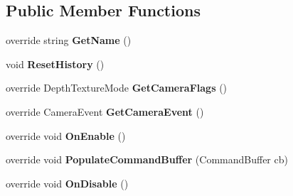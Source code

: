\subsection*{Public Member Functions}
\begin{DoxyCompactItemize}
\item 
\mbox{\label{class_unity_engine_1_1_post_processing_1_1_motion_blur_component_a9ffec424dc428506c72254c3b7d5ce19}} 
override string {\bfseries Get\+Name} ()
\item 
\mbox{\label{class_unity_engine_1_1_post_processing_1_1_motion_blur_component_a796e8f0b76f16076e83b95d302560f95}} 
void {\bfseries Reset\+History} ()
\item 
\mbox{\label{class_unity_engine_1_1_post_processing_1_1_motion_blur_component_a3733dff98d8b6d020c5f494607a6bebd}} 
override Depth\+Texture\+Mode {\bfseries Get\+Camera\+Flags} ()
\item 
\mbox{\label{class_unity_engine_1_1_post_processing_1_1_motion_blur_component_ad3a58d6a79a3e0205cbf63b2312cd68a}} 
override Camera\+Event {\bfseries Get\+Camera\+Event} ()
\item 
\mbox{\label{class_unity_engine_1_1_post_processing_1_1_motion_blur_component_aa48148ebf17e8302a7952a49f7034247}} 
override void {\bfseries On\+Enable} ()
\item 
\mbox{\label{class_unity_engine_1_1_post_processing_1_1_motion_blur_component_a05817ecea251897db84ddaa616955934}} 
override void {\bfseries Populate\+Command\+Buffer} (Command\+Buffer cb)
\item 
\mbox{\label{class_unity_engine_1_1_post_processing_1_1_motion_blur_component_a61167340f6855f661eed95d30c8528b4}} 
override void {\bfseries On\+Disable} ()
\end{DoxyCompactItemize}
